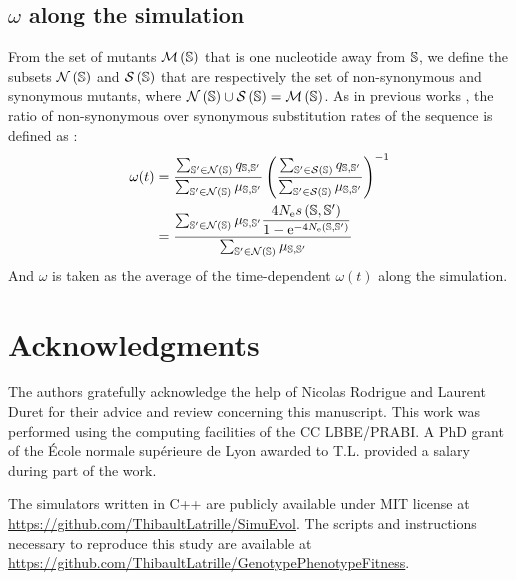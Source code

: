 \subsection{\texorpdfstring{$\omega$}{ω} along the simulation}
From the set of mutants $\mathcal{M}\left(\mathbb{S}\right)$ that is one nucleotide away from $\mathbb{S}$, we define the subsets $\mathcal{N}\left(\mathbb{S}\right)$ and $\mathcal{S}\left(\mathbb{S}\right)$ that are respectively the set of non-synonymous and synonymous mutants, where $\mathcal{N}\left(\mathbb{S}\right) \cup \mathcal{S}\left(\mathbb{S}\right) = \mathcal{M}\left(\mathbb{S}\right)$.
As in previous works \citep{Spielman2015, DosReis2015, Jones2016}, the ratio of non-synonymous over synonymous substitution rates of the sequence is defined as :
\begin{align}
\omega(t) &= \dfrac{\sum_{\mathbb{S}' \in \mathcal{N}\left(\mathbb{S}\right)} q_{\mathbb{S}, \mathbb{S}'}}{\sum_{\mathbb{S}' \in \mathcal{N}\left(\mathbb{S}\right)} \mu_{\mathbb{S}, \mathbb{S}'}} \left( \dfrac{\sum_{\mathbb{S}' \in \mathcal{S}\left(\mathbb{S}\right)} q_{\mathbb{S}, \mathbb{S}'}}{\sum_{\mathbb{S}' \in \mathcal{S}\left(\mathbb{S}\right)} \mu_{\mathbb{S}, \mathbb{S}'}} \right)^{-1}\\
&= \dfrac{\sum_{\mathbb{S}' \in \mathcal{N}\left(\mathbb{S}\right)} \mu_{\mathbb{S}, \mathbb{S}'} \dfrac{4 N_{\mathrm{e}} s \left( \mathbb{S},\mathbb{S}'\right)}{{1 - \mathrm{e}^{-4 N_{\mathrm{e}} \left( \mathbb{S},\mathbb{S}'\right)} }}}{\sum_{\mathbb{S}' \in \mathcal{N}\left(\mathbb{S}\right)} \mu_{\mathbb{S}, \mathbb{S}'}} 
\end{align}
And $\omega$ is taken as the average of the time-dependent $\omega(t)$ along the simulation.

\section{Acknowledgments}

The authors gratefully acknowledge the help of Nicolas Rodrigue and Laurent Duret for their advice and review concerning this manuscript.
This work was performed using the computing facilities of the CC LBBE/PRABI.
A PhD grant of the École normale supérieure de Lyon awarded to T.L. provided a salary during part of the work.

The simulators written in C++ are publicly available under MIT license at \url{https://github.com/ThibaultLatrille/SimuEvol}.
The scripts and instructions necessary to reproduce this study are available at \url{https://github.com/ThibaultLatrille/GenotypePhenotypeFitness}.


